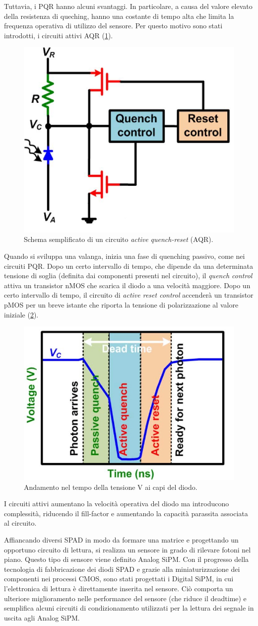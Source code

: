 Tuttavia, i PQR hanno alcuni svantaggi. In particolare, a causa del valore elevato della resistenza di queching, hanno una costante di tempo alta che limita la frequenza operativa di utilizzo del sensore. Per questo motivo sono stati introdotti, i circuiti attivi AQR (\Fig\ref{fig:aqr}).
\begin{figure}[b]
	\centering
	\includegraphics[width=0.35\linewidth]{./ImageFiles/aqr.jpg}
	\caption{Schema semplificato di un circuito \textit{active quench-reset} (AQR)\cite{Palubiak2011}.}
	\label{fig:aqr}
\end{figure} 
Quando si sviluppa una valanga, inizia una fase di quenching passivo, come nei circuiti PQR. Dopo un certo intervallo di tempo, che dipende da una determinata tensione di soglia (definita dai componenti presenti nel circuito), il \textit{quench control} attiva un transistor nMOS che scarica il diodo a una velocità maggiore. Dopo un certo intervallo di tempo, il circuito di \textit{active reset control} accenderà un transistor pMOS per un breve istante che riporta la tensione di polarizzazione al valore iniziale (\Fig\ref{fig:aqr_2}).
\begin{figure}[tbh]
	\centering
	\includegraphics[width=0.5\linewidth]{./ImageFiles/aqr_2.jpg}
	\caption{Andamento nel tempo della tensione V ai capi del diodo\cite{Palubiak2011}.}
	\label{fig:aqr_2}
\end{figure} 
I circuiti attivi aumentano la velocità operativa del diodo ma introducono complessità, riducendo il fill-factor e aumentando la capacità parassita associata al circuito.
\newpage

Affiancando diversi SPAD in modo da formare una matrice e progettando un opportuno circuito di lettura, si realizza un sensore in grado di rilevare fotoni nel piano. Questo tipo di sensore viene definito Analog SiPM. Con il progresso della tecnologia di fabbricazione dei diodi SPAD e grazie alla miniaturizzazione dei componenti nei processi CMOS, sono stati progettati i Digital SiPM, in cui l'elettronica di lettura è direttamente inserita nel sensore. Ciò comporta un ulteriore miglioramento nelle performance del sensore (che riduce il deadtime) e semplifica alcuni circuiti di condizionamento utilizzati per la lettura dei segnale in uscita agli Analog SiPM.

